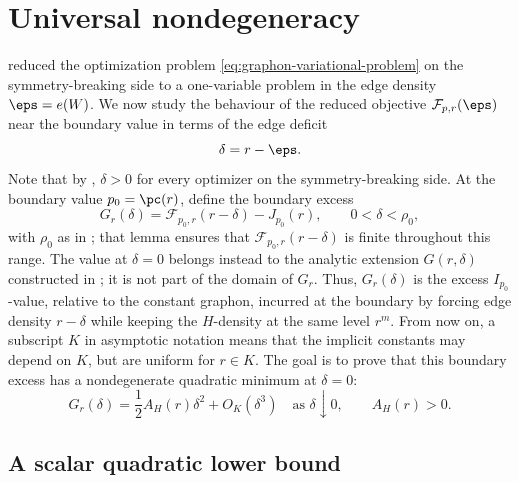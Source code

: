 \section{Universal nondegeneracy}\label{sec:nondegeneracy}

 reduced the optimization problem
\eqref{eq:graphon-variational-problem} on the symmetry-breaking side to a one-variable
problem in the edge density $\eps=e(W)$.  We now study the behaviour of the
reduced objective $\mathcal F_{p,r}(\eps)$ near the boundary value in terms of
the edge deficit
\[
  \delta=r-\eps.
\]
Note that by , $\delta>0$ for every optimizer on the
symmetry-breaking side.
At the boundary value $p_0=\pc(r)$, define the boundary excess
\begin{equation}\label{eq:boundary-excess}
  G_r(\delta)=\mathcal F_{p_0,r}(r-\delta)-J_{p_0}(r),
  \qquad 0<\delta<\rho_0,
\end{equation}
with $\rho_0$ as in ; that lemma ensures
that $\mathcal F_{p_0,r}(r-\delta)$ is finite throughout this range.  The value
at $\delta=0$ belongs instead to the analytic extension $G(r,\delta)$
constructed in ; it is not part of the domain of
$G_r$.
Thus, $G_r(\delta)$ is the excess $I_{p_0}$-value, relative to the constant
graphon, incurred at the boundary by forcing edge density $r-\delta$ while
keeping the $H$-density at the same level $r^m$.  From now on, a subscript $K$
in asymptotic notation means
that the implicit constants may depend on $K$, but are uniform for $r\in K$.
The goal is to prove that this boundary excess has a
nondegenerate quadratic minimum at $\delta=0$:
\[
  G_r(\delta)=\frac12A_H(r)\delta^2+O_K(\delta^3)
  \quad\text{as }\delta\downarrow0,
  \qquad A_H(r)>0.
\]

\subsection{A scalar quadratic lower bound}

